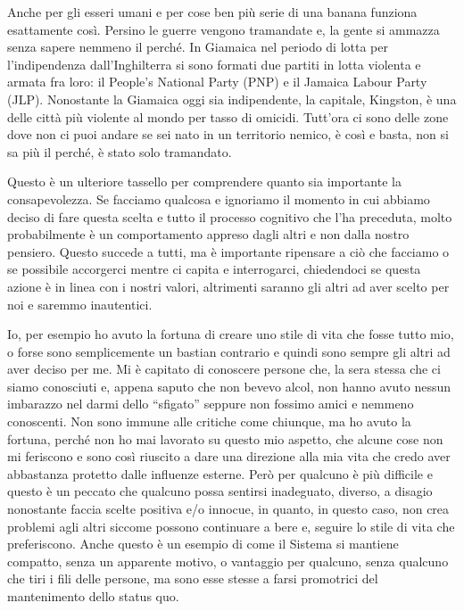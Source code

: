 \documentclass[12pt]{book} %
\begin{document}
Anche per gli esseri umani e per cose ben più serie di una banana funziona esattamente così. Persino le guerre vengono
tramandate e, la gente si ammazza senza sapere nemmeno il perché. In Giamaica nel periodo di lotta per
l'indipendenza dall'Inghilterra si sono formati due partiti in lotta violenta
e armata fra loro: il People's National Party (PNP) e il Jamaica Labour Party (JLP). Nonostante la Giamaica oggi sia
indipendente, la capitale, Kingston, è una delle città più violente al mondo per tasso di omicidi.
Tutt'ora ci sono delle zone dove non ci puoi andare se sei nato in un territorio nemico, è così e
basta, non si sa più il perché, è stato solo tramandato.


\bigskip

Questo è un ulteriore tassello per comprendere quanto sia importante la consapevolezza. Se facciamo qualcosa e ignoriamo
il momento in cui abbiamo deciso di fare questa scelta e tutto il processo cognitivo che l'ha
preceduta, molto probabilmente è un comportamento appreso dagli altri e non dalla nostro pensiero. Questo succede a
tutti, ma è importante ripensare a ciò che facciamo o se possibile accorgerci mentre ci capita e interrogarci,
chiedendoci se questa azione è in linea con i nostri valori, altrimenti saranno gli altri ad aver scelto per noi e
saremmo inautentici.


\bigskip

Io, per esempio ho avuto la fortuna di creare uno stile di vita che fosse tutto mio, o forse sono semplicemente un
bastian contrario e quindi sono sempre gli altri ad aver deciso per me. Mi è capitato di conoscere persone che, la sera
stessa che ci siamo conosciuti e, appena saputo che non bevevo alcol, non hanno avuto nessun imbarazzo nel darmi dello
“sfigato” seppure non fossimo amici e nemmeno conoscenti. Non sono immune alle critiche come chiunque, ma ho avuto la
fortuna, perché non ho mai lavorato su questo mio aspetto, che alcune cose non mi feriscono e sono così riuscito a dare
una direzione alla mia vita che credo aver abbastanza protetto dalle influenze esterne. Però per qualcuno è più
difficile e questo è un peccato che qualcuno possa sentirsi inadeguato, diverso, a disagio nonostante faccia scelte
positiva e/o innocue, in quanto, in questo caso, non crea problemi agli altri siccome possono continuare a bere e,
seguire lo stile di vita che preferiscono. Anche questo è un esempio di come il Sistema si mantiene compatto, senza un
apparente motivo, o vantaggio per qualcuno, senza qualcuno che tiri i fili delle persone, ma sono esse stesse a farsi
promotrici del mantenimento dello status quo. 
\end{document}
